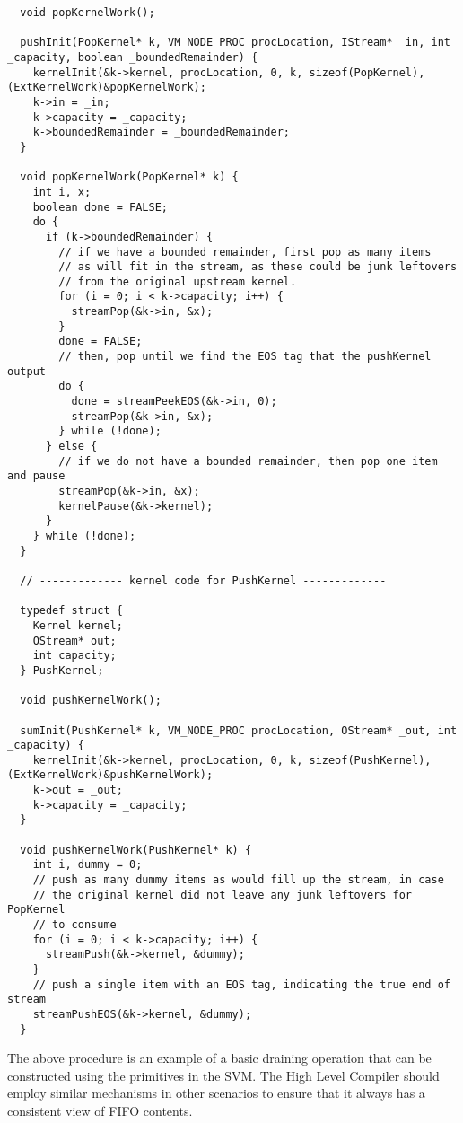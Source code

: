 {\begin{verbatim}
  void popKernelWork();
  
  pushInit(PopKernel* k, VM_NODE_PROC procLocation, IStream* _in, int _capacity, boolean _boundedRemainder) {
    kernelInit(&k->kernel, procLocation, 0, k, sizeof(PopKernel), (ExtKernelWork)&popKernelWork); 
    k->in = _in;
    k->capacity = _capacity;
    k->boundedRemainder = _boundedRemainder;
  }

  void popKernelWork(PopKernel* k) {
    int i, x;
    boolean done = FALSE;
    do {
      if (k->boundedRemainder) {
        // if we have a bounded remainder, first pop as many items
        // as will fit in the stream, as these could be junk leftovers 
        // from the original upstream kernel.
        for (i = 0; i < k->capacity; i++) {
          streamPop(&k->in, &x);
        }
        done = FALSE;
        // then, pop until we find the EOS tag that the pushKernel output
        do {
          done = streamPeekEOS(&k->in, 0);
          streamPop(&k->in, &x);
        } while (!done);
      } else {
        // if we do not have a bounded remainder, then pop one item and pause
        streamPop(&k->in, &x);
        kernelPause(&k->kernel);
      }
    } while (!done);
  }

  // ------------- kernel code for PushKernel -------------

  typedef struct {
    Kernel kernel;
    OStream* out;
    int capacity;
  } PushKernel;

  void pushKernelWork();
  
  sumInit(PushKernel* k, VM_NODE_PROC procLocation, OStream* _out, int _capacity) {
    kernelInit(&k->kernel, procLocation, 0, k, sizeof(PushKernel), (ExtKernelWork)&pushKernelWork); 
    k->out = _out;
    k->capacity = _capacity;
  }

  void pushKernelWork(PushKernel* k) {
    int i, dummy = 0;
    // push as many dummy items as would fill up the stream, in case
    // the original kernel did not leave any junk leftovers for PopKernel 
    // to consume
    for (i = 0; i < k->capacity; i++) {
      streamPush(&k->kernel, &dummy);
    }
    // push a single item with an EOS tag, indicating the true end of stream
    streamPushEOS(&k->kernel, &dummy);
  }
\end{verbatim}}

The above procedure is an example of a basic draining operation that
can be constructed using the primitives in the SVM.  The High Level
Compiler should employ similar mechanisms in other scenarios to ensure
that it always has a consistent view of FIFO contents.

